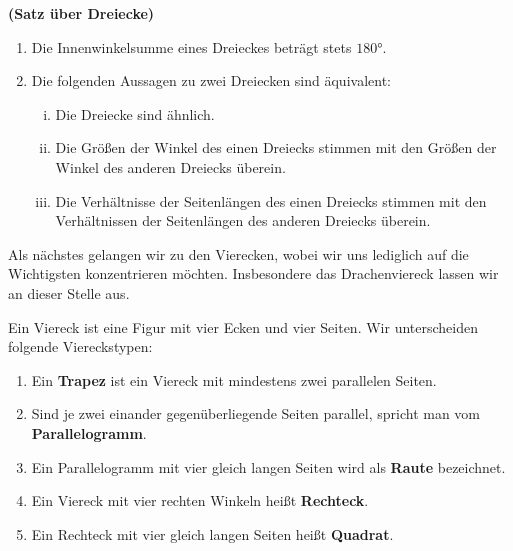 \documentclass[ngerman, 12pt]{nssheetxea}
\begin{document}
\begin{theorem} \textbf{(Satz über Dreiecke)} \par
\begin{enumerate}
\item Die Innenwinkelsumme eines Dreieckes beträgt stets $\ang{180}$.
\item Die folgenden Aussagen zu zwei Dreiecken sind äquivalent:
\begin{enumerate}[i)]
	\item Die Dreiecke sind ähnlich.
	\item Die Größen der Winkel des einen Dreiecks stimmen mit den Größen der Winkel des anderen Dreiecks überein.
	\item Die Verhältnisse der Seitenlängen des einen Dreiecks stimmen mit den Verhältnissen der Seitenlängen des anderen Dreiecks überein.
\end{enumerate}
\end{enumerate}
\end{theorem}

Als nächstes gelangen wir zu den Vierecken, wobei wir uns lediglich auf die Wichtigsten konzentrieren möchten. Insbesondere das Drachenviereck lassen wir an dieser Stelle aus.

\begin{definition}
Ein Viereck ist eine Figur mit vier Ecken und vier Seiten. Wir unterscheiden folgende Viereckstypen:
\begin{enumerate}
\item Ein \textbf{Trapez} ist ein Viereck mit mindestens zwei parallelen Seiten.
\item Sind je zwei einander gegenüberliegende Seiten parallel, spricht man vom \textbf{Parallelogramm}.
\item Ein Parallelogramm mit vier gleich langen Seiten wird als \textbf{Raute} bezeichnet.
\item Ein Viereck mit vier rechten Winkeln heißt \textbf{Rechteck}.
\item Ein Rechteck mit vier gleich langen Seiten heißt \textbf{Quadrat}. 
\end{enumerate}
\end{definition}
\end{document}
